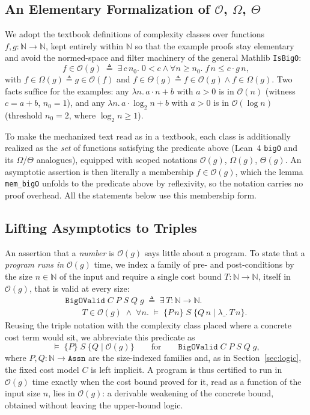 \documentclass[runningheads]{llncs}
\newcommand{\Lean}{Lean~4\xspace}
\newcommand{\Nat}{\mathbb{N}}
\newcommand{\triple}[4]{\{#1\}\;#2\;\{#3 \mid #4\}}
\newcommand{\Valid}{\vDash}
\newcommand{\BigO}{\mathcal{O}}
\newcommand{\BigTh}{\Theta}
\newcommand{\BigOm}{\Omega}
\newcommand{\code}[1]{\texttt{#1}}
\begin{document}
\subsection{An Elementary Formalization of $\BigO$, $\BigOm$, $\BigTh$}

We adopt the textbook definitions of complexity classes over functions
$f, g : \Nat \to \Nat$, kept entirely within $\Nat$ so that the example proofs
stay elementary and avoid the normed-space and filter machinery of the general
Mathlib \code{IsBigO}:
\[
f \in \BigO(g) \;\triangleq\;
\exists\,c\,n_0.\; 0 < c \wedge \forall n \ge n_0.\; f\,n \le
c \cdot g\,n,
\]
with $f \in \BigOm(g) \triangleq g \in \BigO(f)$ and
$f \in \BigTh(g) \triangleq f \in \BigO(g) \wedge f \in \BigOm(g)$.
Two facts suffice for the examples: any $\lambda n.\,a\cdot n + b$ with $a > 0$ is
in $\BigO(n)$ (witness $c = a+b$, $n_0 = 1$), and any
$\lambda n.\,a\cdot\log_2 n + b$ with $a > 0$ is in $\BigO(\log n)$ (threshold
$n_0 = 2$, where $\log_2 n \ge 1$).

To make the mechanized text read as in a textbook, each class is additionally
realized as the \emph{set} of functions satisfying the predicate above (\Lean{}
\code{bigO} and its $\BigOm$/$\BigTh$ analogues), equipped with scoped notations
$\BigO(g)$, $\BigOm(g)$, $\BigTh(g)$.
An asymptotic assertion is then literally a membership $f \in
\BigO(g)$, which the
lemma \code{mem\_bigO} unfolds to the predicate above by reflexivity, so the
notation carries no proof overhead.
All the statements below use this membership form.

\subsection{Lifting Asymptotics to Triples}

An assertion that a \emph{number} is $\BigO(g)$ says little about a program.
To state that a \emph{program runs in} $\BigO(g)$ time, we index a family of
pre- and post-conditions by the size $n \in \Nat$ of the input and require a
single cost bound $T : \Nat \to \Nat$, itself in $\BigO(g)$, that is valid at
every size:
\[
\begin{array}{l}
\code{BigOValid}\;C\;P\;S\;Q\;g \;\triangleq\;
\exists\,T : \Nat \to \Nat.\;\\
\qquad T \in \BigO(g) \;\wedge\;
\forall n.\; \Valid\;\triple{P\,n}{S}{Q\,n}{\lambda\_. \,T\,n}.
\end{array}
\]
Reusing the triple notation with the complexity class placed where a concrete
cost term would sit, we abbreviate this predicate as
\[
\Valid\;\triple{P}{S}{Q}{\BigO(g)}
\qquad\text{for}\qquad
\code{BigOValid}\;C\;P\;S\;Q\;g,
\]
where $P, Q : \Nat \to \code{Assn}$ are the size-indexed families and, as in
Section~\ref{sec:logic}, the fixed cost model $C$ is left implicit.
A program is thus certified to run in $\BigO(g)$ time exactly when the cost bound
proved for it, read as a function of the input size $n$, lies in $\BigO(g)$: a
derivable weakening of the concrete bound, obtained without leaving the
upper-bound logic.
\end{document}
